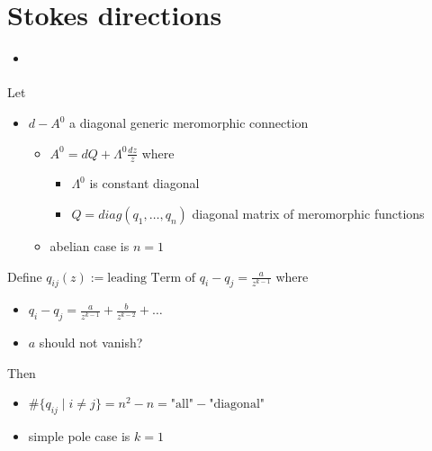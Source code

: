 \section{Stokes directions}%
\begin{frame}
  {\Huge\insertsection{}}
  \begin{itemize}
    \item \cite{boalch}
  \end{itemize}
Let
\begin{itemize}
  \item $d-A^0$ a diagonal generic meromorphic connection
    \begin{itemize}
      \item $A^0=dQ+\Lambda^0\frac{dz}{z}$ where
        \begin{itemize}
          \item $\Lambda^0$ is constant diagonal
          \item $Q=diag(q_1,\dots,q_n)$ diagonal matrix of meromorphic functions
        \end{itemize}
      \item abelian case is $n=1$
    \end{itemize}
  \end{itemize}
  Define $q_{ij}(z):=\text{leading Term of }q_i-q_j = \frac{a}{z^{k-1}}$ where
  \begin{itemize}
    \item $q_i-q_j = \frac{a}{z^{k-1}} + \frac{b}{z^{k-2}}+\dots$
    \item $a$ should \textcolor{red!60!black}{not vanish?}
  \end{itemize}
  Then
  \begin{itemize}
    \item $\#\{q_{ij}\mid i \neq j\}=n^2-n=\text{"all"}-\text{"diagonal"}$
    \item simple pole case is $k=1$
  \end{itemize}
\end{frame}

